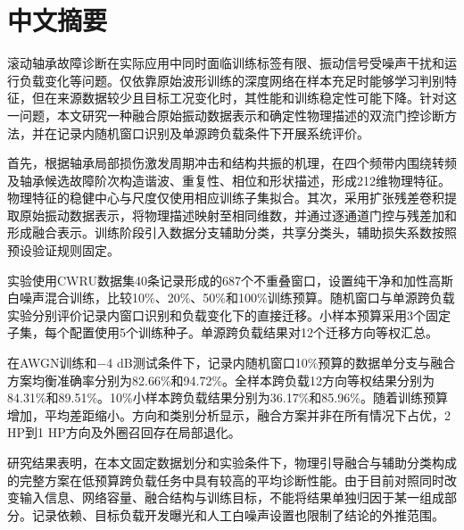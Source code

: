 \documentclass[UTF8,12pt,openany,twoside]{ctexbook}
\numberwithin{equation}{chapter}
\begin{document}
\begin{titlepage}\centering{}\end{titlepage}
\frontmatter
\chapter*{中文摘要}

滚动轴承故障诊断在实际应用中同时面临训练标签有限、振动信号受噪声干扰和运行负载变化等问题。仅依靠原始波形训练的深度网络在样本充足时能够学习判别特征，但在来源数据较少且目标工况变化时，其性能和训练稳定性可能下降。针对这一问题，本文研究一种融合原始振动数据表示和确定性物理描述的双流门控诊断方法，并在记录内随机窗口识别及单源跨负载条件下开展系统评价。

首先，根据轴承局部损伤激发周期冲击和结构共振的机理，在四个频带内围绕转频及轴承候选故障阶次构造谐波、重复性、相位和形状描述，形成212维物理特征。物理特征的稳健中心与尺度仅使用相应训练子集拟合。其次，采用扩张残差卷积提取原始振动数据表示，将物理描述映射至相同维数，并通过逐通道门控与残差加和形成融合表示。训练阶段引入数据分支辅助分类，共享分类头，辅助损失系数按照预设验证规则固定。

实验使用CWRU数据集40条记录形成的687个不重叠窗口，设置纯干净和加性高斯白噪声混合训练，比较10\%、20\%、50\%和100\%训练预算。随机窗口与单源跨负载实验分别评价记录内窗口识别和负载变化下的直接迁移。小样本预算采用3个固定子集，每个配置使用5个训练种子。单源跨负载结果对12个迁移方向等权汇总。

在AWGN训练和−4 dB测试条件下，记录内随机窗口10\%预算的数据单分支与融合方案均衡准确率分别为82.66\%和94.72\%。全样本跨负载12方向等权结果分别为84.31\%和89.51\%。10\%小样本跨负载结果分别为36.17\%和85.96\%。随着训练预算增加，平均差距缩小。方向和类别分析显示，融合方案并非在所有情况下占优，2 HP到1 HP方向及外圈召回存在局部退化。

研究结果表明，在本文固定数据划分和实验条件下，物理引导融合与辅助分类构成的完整方案在低预算跨负载任务中具有较高的平均诊断性能。由于目前对照同时改变输入信息、网络容量、融合结构与训练目标，不能将结果单独归因于某一组成部分。记录依赖、目标负载开发曝光和人工白噪声设置也限制了结论的外推范围。
\end{document}
